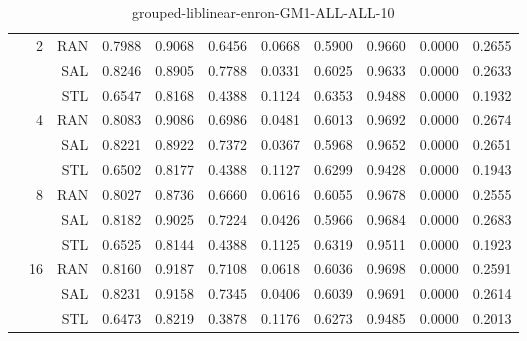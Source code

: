 \begin{center}
\begin{table}[htbp]
\begin{tabular}{ | r | r | r | r | r | r | r | r | r | r | r |}
 & \multirow{3}{*}{2} & RAN & 0.7988 & 0.9068 & 0.6456 & 0.0668 & 0.5900 & 0.9660 & 0.0000 & 0.2655\\ \cline{3-11}
 &   & SAL & 0.8246 & 0.8905 & 0.7788 & 0.0331 & 0.6025 & 0.9633 & 0.0000 & 0.2633\\ \cline{3-11}
 &   & STL & 0.6547 & 0.8168 & 0.4388 & 0.1124 & 0.6353 & 0.9488 & 0.0000 & 0.1932\\ \cline{2-11}
 & \multirow{3}{*}{4} & RAN & 0.8083 & 0.9086 & 0.6986 & 0.0481 & 0.6013 & 0.9692 & 0.0000 & 0.2674\\ \cline{3-11}
 &   & SAL & 0.8221 & 0.8922 & 0.7372 & 0.0367 & 0.5968 & 0.9652 & 0.0000 & 0.2651\\ \cline{3-11}
 &   & STL & 0.6502 & 0.8177 & 0.4388 & 0.1127 & 0.6299 & 0.9428 & 0.0000 & 0.1943\\ \cline{2-11}
 & \multirow{3}{*}{8} & RAN & 0.8027 & 0.8736 & 0.6660 & 0.0616 & 0.6055 & 0.9678 & 0.0000 & 0.2555\\ \cline{3-11}
 &   & SAL & 0.8182 & 0.9025 & 0.7224 & 0.0426 & 0.5966 & 0.9684 & 0.0000 & 0.2683\\ \cline{3-11}
 &   & STL & 0.6525 & 0.8144 & 0.4388 & 0.1125 & 0.6319 & 0.9511 & 0.0000 & 0.1923\\ \cline{2-11}
 & \multirow{3}{*}{16} & RAN & 0.8160 & 0.9187 & 0.7108 & 0.0618 & 0.6036 & 0.9698 & 0.0000 & 0.2591\\ \cline{3-11}
 &   & SAL & 0.8231 & 0.9158 & 0.7345 & 0.0406 & 0.6039 & 0.9691 & 0.0000 & 0.2614\\ \cline{3-11}
 &   & STL & 0.6473 & 0.8219 & 0.3878 & 0.1176 & 0.6273 & 0.9485 & 0.0000 & 0.2013\\ \cline{2-11}
\hline
\end{tabular}
\caption{grouped-liblinear-enron-GM1-ALL-ALL-10}
\end{table}
\end{center}

